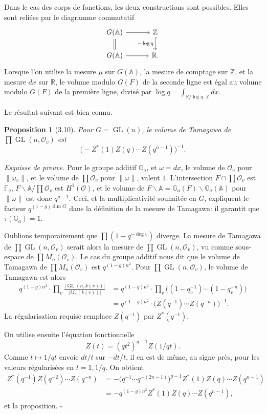 \documentclass[10pt]{article}
\newcommand{\Fq}{\mathbb F_q}
\newcommand{\Z}{\mathbb Z}
\newcommand{\Adele}{\mathbb A}
\newcommand{\GL}{\operatorname{GL}}
\newcommand{\degm}{\operatorname{deg}}
\newcommand{\OO}{\mathcal O}
\theoremstyle{deligne}
\newtheorem*{proposition*}{Proposition}
\newenvironment{sketchproof}[1][Esquisse de preuve.]{\textit{#1}}{\hfill$\square$}
\begin{document}
Dans le cas des corps de fonctions, les deux constructions sont possibles. Elles sont reliées par le diagramme commutatif
\[
\begin{tikzcd}[column sep=3.2em,row sep=1.5em]
G(\Adele) \arrow[r] \arrow[d,equal] & \Z \arrow[d,hook,"-\log q"']\\
G(\Adele) \arrow[r] & \mathbb R .
\end{tikzcd}
\]
Lorsque l'on utilise la mesure $\mu$ sur $G(\Adele)$, la mesure de comptage sur $\Z$, et la mesure $dx$ sur $\mathbb R$, le volume modulo $G(F)$ de la seconde ligne est égal au volume modulo $G(F)$ de la première ligne, divisé par $\log q=\int_{\mathbb R/\log q\cdot\Z}dx$.

Le résultat suivant est bien connu.

\begin{proposition*}[3.10]
Pour $G=\GL(n)$, le volume de Tamagawa de $\prod\GL(n,\OO_v)$ est
\[
\bigl(-Z^*(1)Z(q)\cdots Z(q^{n-1})\bigr)^{-1}.
\]
\end{proposition*}

\begin{sketchproof}
Pour le groupe additif $\mathbb G_a$, et $\omega=dx$, le volume de $\OO_v$ pour $\|\omega_v\|$, et le volume de $\prod\OO_v$ pour $\|\omega\|$, valent $1$. L'intersection $F\cap\prod\OO_v$ est $\Fq$, $F\backslash\Adele/\prod\OO_v$ est $H^1(\OO)$, et le volume de $F\backslash\Adele=\mathbb G_a(F)\backslash\mathbb G_a(\Adele)$ pour $\|\omega\|$ est donc $q^{g-1}$. Ceci, et la multiplicativité souhaitée en $G$, expliquent le facteur $q^{(1-g)\dim G}$ dans la définition de la mesure de Tamagawa: il garantit que $\tau(\mathbb G_a)=1$.

Oublions temporairement que $\prod(1-q^{-\degm v})$ diverge. La mesure de Tamagawa de $\prod\GL(n,\OO_v)$ serait alors la mesure de $\prod\GL(n,\OO_v)$, vu comme sous-espace de $\prod M_n(\OO_v)$. Le cas du groupe additif nous dit que le volume de Tamagawa de $\prod M_n(\OO_v)$ est $q^{(1-g)n^2}$. Pour $\prod\GL(n,\OO_v)$, le volume de Tamagawa est alors
\begin{align*}
q^{(1-g)n^2}\cdot\prod_v\frac{|\GL(n,k(v))|}{|M_n(k(v))|}
&=q^{(1-g)n^2}\cdot\prod_v\bigl((1-q_v^{-1})\cdots(1-q_v^{-n})\bigr)\\
&=q^{(1-g)n^2}\cdot\bigl(Z(q^{-1})\cdots Z(q^{-n})\bigr)^{-1}.
\end{align*}
La régularisation requise remplace $Z(q^{-1})$ par $Z^*(q^{-1})$.

On utilise ensuite l'équation fonctionnelle
\[
Z(t)=(qt^2)^{g-1}Z(1/qt).
\]
Comme $t\mapsto1/qt$ envoie $dt/t$ sur $-dt/t$, il en est de même, au signe près, pour les valeurs régularisées en $t=1,1/q$. On obtient
\begin{align*}
Z^*(q^{-1})Z(q^{-2})\cdots Z(q^{-n})
&=-\bigl(q^{-1}\cdots q^{-(2n-1)}\bigr)^{g-1}Z^*(1)Z(q)\cdots Z(q^{n-1})\\
&=-q^{(1-g)n^2}Z^*(1)Z(q)\cdots Z(q^{n-1}),
\end{align*}
et la proposition.
\end{sketchproof}
\end{document}
